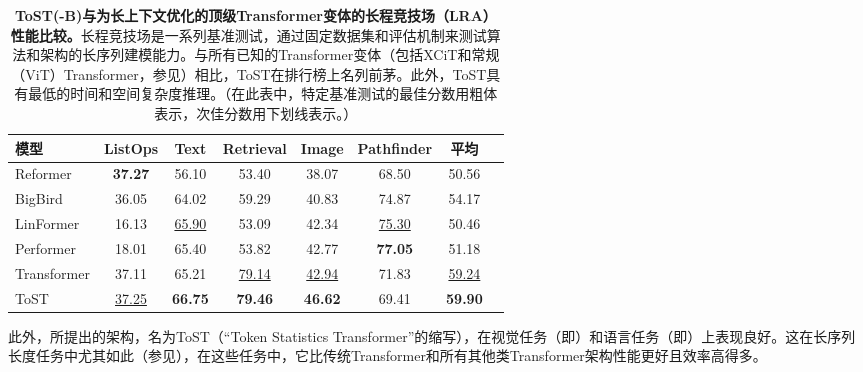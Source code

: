 \documentclass[../../book-main_zh.tex]{subfiles}
\begin{document}
\begin{table}
    \centering
    
    \begin{tabular}{@{}lccccccc@{}}
            \toprule
            模型        & ListOps  & Text     & Retrieval & Image    & Pathfinder & 平均      \\
            \midrule
            \midrule
            Reformer              & \textbf{37.27} & 56.10             & 53.40              & 38.07             & 68.50               & 50.56             \\
            BigBird               & 36.05             & 64.02             & 59.29              & 40.83             & 74.87                & 54.17             \\
            LinFormer         & 16.13             & \underline{65.90} & 53.09              & 42.34             & \underline{75.30}               & 50.46             \\
            Performer             & 18.01             & 65.40             & 53.82              & 42.77             & \textbf{77.05}                & 51.18             \\
            Transformer           & 37.11             & 65.21             & \underline{79.14}              & \underline{42.94}             & 71.83              & \underline{59.24}            \\
            ToST & \underline{37.25}    & \textbf{66.75}    & \textbf{79.46}     & \textbf{46.62}    &    69.41      &     \textbf{59.90}\\
            
            \bottomrule
        \end{tabular}%
    \caption{\small \textbf{ToST(-B)与为长上下文优化的顶级Transformer变体的长程竞技场（LRA）性能比较。}长程竞技场是一系列基准测试，通过固定数据集和评估机制来测试算法和架构的长序列建模能力。与所有已知的Transformer变体（包括XCiT和常规（ViT）Transformer，参见）相比，ToST在排行榜上名列前茅。此外，ToST具有最低的时间和空间复杂度推理。（在此表中，特定基准测试的最佳分数用粗体表示，次佳分数用下划线表示。）}
    \label{tab:tost_lra_results}
\end{table}

此外，所提出的架构，名为ToST（“Token Statistics Transformer”的缩写），在视觉任务（即）和语言任务（即）上表现良好。这在长序列长度任务中尤其如此（参见），在这些任务中，它比传统Transformer和所有其他类Transformer架构性能更好且效率高得多。
\end{document}
